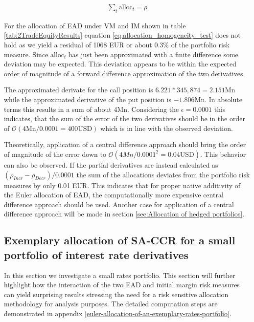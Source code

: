 \documentclass[../Thesis_AHoecherl.tex]{subfiles}
\begin{document}
    \begin{align}
        \label{eq:allocation_homogeneity_test}
        \sum_t{\text{alloc}_t} = \rho
    \end{align}
    
    
    For the allocation of \gls{EAD} under \gls{VM} and \gls{IM} shown in table \ref{tab:2TradeEquityResults} equation \ref{eq:allocation_homogeneity_test} does not hold as we yield a residual of 1068 EUR or about 0.3\% of the portfolio risk measure. Since $\text{alloc}_t$ has just been approximated with a finite difference some deviation may be expected. This deviation appears to be within the expected order of magnitude of a forward difference approximation of the two derivatives.

    The approximated derivate for the call position is $6.221 * 345,874 = 2.151 \text{Mn}$ while the approximated derivative of the put position is $-1.806 \text{Mn}$. 
    In absolute terms this results in a sum of about 4Mn. Considering the $\epsilon = 0.0001$ this indicates, that the sum of the error of the two derivatives should be in the order of $\mathcal{O}\left(4\text{Mn}/0.0001 = 400 \text{USD}\right)$ which is in line with the observed deviation.

    Theoretically, application of a central difference approach should bring the order of magnitude of the error down to $\mathcal{O}\left(4Mn/0.0001^2 = 0.04 \text{USD}\right)$.
     This behavior can also be observed. 
    If the partial derivatives are instead calculated as $(\rho_{Incr}-\rho_{Decr})/0.0001$ the sum of the allocations deviates from the portfolio risk measures by only 0.01 EUR. 
    This indicates that for proper native additivity of the Euler allocation of EAD, the computationally more expensive central difference approach should be used.
    Another case for application of a central difference approach will be made in section \ref{sec:Allocation of hedged portfolios}.

    \subsection{Exemplary allocation of SA-CCR for a small portfolio of interest rate derivatives\label{sec:Exemplary allocation of SA-CCR for a small portfolio of interst rate derivatives}}

    In this section we investigate a small rates portfolio. This section will further highlight how the interaction of the two \gls{EAD} and initial margin risk measures can yield surprising results stressing the need for a risk sensitive allocation methodology for analysis purposes. The detailed computation steps are demonstrated in appendix \ref{euler-allocation-of-an-exemplary-rates-portfolio}.
\end{document}
